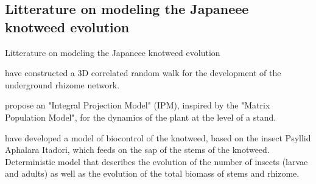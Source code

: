 \documentclass{myBeamer}
\begin{document}
\subsection*{Litterature on modeling the Japaneee knotweed evolution}
\begin{frame}{Litterature on modeling the Japaneee knotweed evolution}

\begin{itemize}
\noindent
\begin{minipage}{0.60\linewidth}
\item  
\cite{smith2007simulation} have constructed a 3D correlated random walk for the development of the underground rhizome network.
\end{minipage}
\begin{minipage}{0.35\linewidth}
\begin{figure}[H] 
\end{figure}
\end{minipage}

\item
\cite{dauer2013elucidating} propose an "Integral Projection Model" (IPM), inspired by the "Matrix Population Model", for the dynamics of the plant at the level of a stand.

\bigbreak
\item 
\cite{gourley2016mathematical} have developed a model of biocontrol of the knotweed, based on the insect Psyllid Aphalara Itadori, which feeds on the sap of the stems of the knotweed. Deterministic model that describes the evolution of the number of insects (larvae and adults) as well as the evolution of the total biomass of stems and rhizome.
\end{itemize}

\end{frame}
\end{document}
